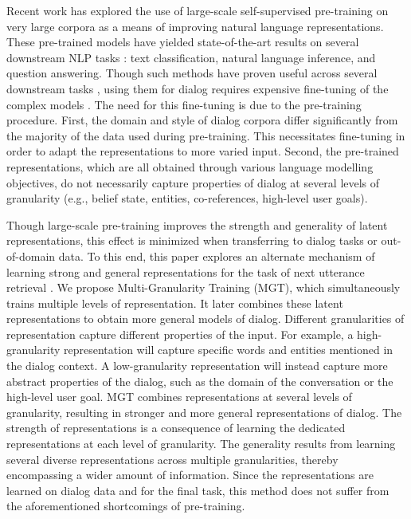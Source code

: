 \documentclass[11pt,a4paper]{article}
\begin{document}
Recent work has explored the use of large-scale self-supervised pre-training on very large corpora \citep{kiros2015skip,peters2018deep,devlin2018bert,radford2018improving} as a means of improving natural language representations. These pre-trained models have yielded state-of-the-art results on several downstream NLP tasks \citep{wang2018glue}: text classification, natural language inference, and question answering. Though such methods have proven useful across several downstream tasks \citep{wang2018glue}, using them for dialog requires expensive fine-tuning of the complex models \citep{dinan2019second,alberti2019bert}. The need for this fine-tuning is due to the pre-training procedure. First, the domain and style of dialog corpora differ significantly from the majority of the data used during pre-training. This necessitates fine-tuning in order to adapt the representations to more varied input. Second, the pre-trained representations, which are all obtained through various language modelling objectives, do not necessarily capture properties of dialog at several levels of granularity (e.g., belief state, entities, co-references, high-level user goals). 

Though large-scale pre-training improves the strength and generality of latent representations, this effect is minimized when transferring to dialog tasks or out-of-domain data. To this end, this paper explores an alternate mechanism of learning strong and general representations for the task of next utterance retrieval \citep{lowe2015ubuntu}. We propose Multi-Granularity Training (MGT), which simultaneously trains multiple levels of representation. It later combines these latent representations to obtain more general models of dialog. Different granularities of representation capture different properties of the input. For example, a high-granularity representation will capture specific words and entities mentioned in the dialog context. A low-granularity representation will instead capture more abstract properties of the dialog, such as the domain of the conversation or the high-level user goal. MGT combines representations at several levels of granularity, resulting in stronger and more general representations of dialog. The strength of representations is a consequence of learning the dedicated representations at each level of granularity. The generality results from learning several diverse representations across multiple granularities, thereby encompassing a wider amount of information. Since the representations are learned on dialog data and for the final task, this method does not suffer from the aforementioned shortcomings of pre-training. 
\end{document}
